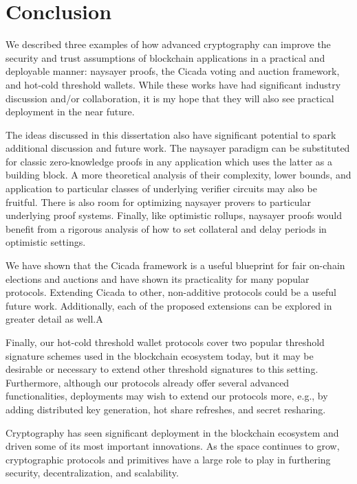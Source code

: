 \section{Conclusion}\label{sec:conclusion}

We described three examples of how advanced cryptography can improve the security and trust assumptions of blockchain applications in a practical and deployable manner: naysayer proofs, the Cicada voting and auction framework, and hot-cold threshold wallets. While these works have had significant industry discussion and/or collaboration, it is my hope that they will also see practical deployment in the near future. 

The ideas discussed in this dissertation also have significant potential to spark additional discussion and future work. The naysayer paradigm can be substituted for classic zero-knowledge proofs in any application which uses the latter as a building block. A more theoretical analysis of their complexity, lower bounds, and application to particular classes of underlying verifier circuits may also be fruitful. There is also room for optimizing naysayer provers to particular underlying proof systems. Finally, like optimistic rollups, naysayer proofs would benefit from a rigorous analysis of how to set collateral and delay periods in optimistic settings.

We have shown that the Cicada framework is a useful blueprint for fair on-chain elections and auctions and have shown its practicality for many popular protocols. Extending Cicada to other, non-additive protocols could be a useful future work. Additionally, each of the proposed extensions can be explored in greater detail as well.A

Finally, our hot-cold threshold wallet protocols cover two popular threshold signature schemes used in the blockchain ecosystem today, but it may be desirable or necessary to extend other threshold signatures to this setting. Furthermore, although our protocols already offer several advanced functionalities, deployments may wish to extend our protocols more, e.g., by adding distributed key generation, hot share refreshes, and secret resharing.

Cryptography has seen significant deployment in the blockchain ecosystem and driven some of its most important innovations. As the space continues to grow, cryptographic protocols and primitives have a large role to play in furthering security, decentralization, and scalability.